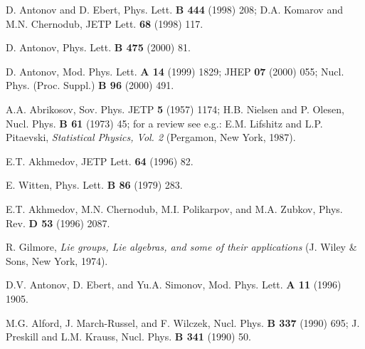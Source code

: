 \documentclass[a4paper,12pt]{article}
\begin{document}
\begin{thebibliography}{99}
D. Antonov and D. Ebert, Phys. Lett. {\bf B 444} (1998) 208;
D.A. Komarov and M.N. Chernodub, JETP Lett. {\bf 68} (1998) 117.

D. Antonov, Phys. Lett. {\bf B 475} (2000) 81.

D. Antonov, Mod. Phys. Lett. {\bf A 14} (1999) 1829; JHEP {\bf 07} (2000) 055;
Nucl. Phys. (Proc. Suppl.) {\bf B 96} (2000) 491.

A.A. Abrikosov, Sov. Phys. JETP {\bf 5} (1957) 1174;
H.B. Nielsen and P. Olesen, Nucl. Phys. {\bf B 61} (1973) 45;
for a review see e.g.: E.M. Lifshitz and L.P. Pitaevski,
{\it Statistical Physics, Vol. 2} (Pergamon, New York, 1987).

E.T. Akhmedov, JETP Lett. {\bf 64} (1996) 82.

E. Witten, Phys. Lett. {\bf B 86} (1979) 283.

E.T. Akhmedov, M.N. Chernodub, M.I. Polikarpov, and M.A. Zubkov,
Phys. Rev. {\bf D 53} (1996) 2087.

R. Gilmore, {\it Lie groups, Lie algebras, and some of their applications}
(J. Wiley \& Sons, New York, 1974).

D.V. Antonov, D. Ebert, and Yu.A. Simonov, Mod. Phys. Lett. {\bf A 11} (1996) 1905.

M.G. Alford, J. March-Russel, and F. Wilczek, Nucl. Phys.
{\bf B 337} (1990) 695; J. Preskill and L.M. Krauss, Nucl. Phys.
{\bf B 341} (1990) 50.







\end{thebibliography}
\end{document}
